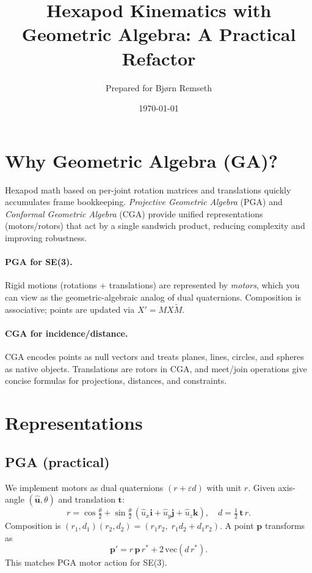\documentclass[11pt]{article}
\title{Hexapod Kinematics with Geometric Algebra: A Practical Refactor}
\author{Prepared for Bj\o rn Remseth}
\date{\today}
\begin{document}
\maketitle

\section{Why Geometric Algebra (GA)?}
Hexapod math based on per-joint rotation matrices and translations quickly accumulates frame bookkeeping.
\emph{Projective Geometric Algebra} (PGA) and \emph{Conformal Geometric Algebra} (CGA) provide unified representations (motors/rotors) that act by a single sandwich product, reducing complexity and improving robustness.

\paragraph{PGA for SE(3).}
Rigid motions (rotations + translations) are represented by \emph{motors}, which you can view as the geometric-algebraic analog of dual quaternions. Composition is associative; points are updated via $X' = M X \tilde{M}$.

\paragraph{CGA for incidence/distance.}
CGA encodes points as null vectors and treats planes, lines, circles, and spheres as native objects. Translations are rotors in CGA, and meet/join operations give concise formulas for projections, distances, and constraints.

\section{Representations}
\subsection{PGA (practical)}
We implement motors as dual quaternions $(r + \varepsilon d)$ with unit $r$.
Given axis-angle $(\mathbf{\hat{u}}, \theta)$ and translation $\mathbf{t}$:
\[
r = \cos \tfrac{\theta}{2} + \sin \tfrac{\theta}{2} \, (\hat{u}_x \mathbf{i} + \hat{u}_y \mathbf{j} + \hat{u}_z \mathbf{k}),\quad
d = \tfrac{1}{2} \, \mathbf{t}\, r.
\]
Composition is $(r_1, d_1)(r_2, d_2) = (r_1 r_2,\; r_1 d_2 + d_1 r_2)$.
A point $\mathbf{p}$ transforms as
\[
\mathbf{p}' = r\,\mathbf{p}\,r^* + 2\,\mathrm{vec}(d\,r^*).
\]
This matches PGA motor action for SE(3).
\end{document}
